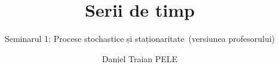 \title[Serii de timp]{Serii de timp}
\subtitle{Seminarul 1: Procese stochastice și staționaritate\ifsolutions\ (versiunea profesorului)\fi}
\author[D.T. Pele]{Daniel Traian PELE}
\date{}

\providecommand{\tsaapplink}[3]{\hypertarget{#2}{}\hyperlink{#1}{\beamergotobutton{#3}}}  %
\providecommand{\tsaappback}[2]{\begin{tikzpicture}[remember picture,overlay]\node[anchor=south east] at ([xshift=-3mm,yshift=7mm]current page.south east){\hyperlink{#1}{\beamerreturnbutton{#2}}};\end{tikzpicture}}  %
\providecommand{\tsachlink}[2]{\href{#1}{#2}}  %
\providecommand{\tsachlinkt}[2]{\href{#1}{\usebeamercolor[fg]{frametitle}#2}}  %


